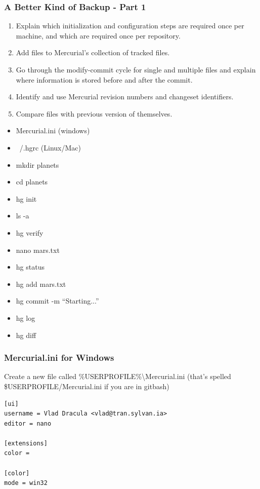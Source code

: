 \documentclass[xcolor=dvipsnames]{beamer}
\begin{document}
\begin{frame}
\frametitle{A Better Kind of Backup - Part 1}
\begin{enumerate}
\item Explain which initialization and configuration steps are required once per machine, and which are required once per repository.
\item Add files to Mercurial's collection of tracked files.
\item Go through the modify-commit cycle for single and multiple files and explain where information is stored before and after the commit.
\item Identify and use Mercurial revision numbers and changeset identifiers.
\item Compare files with previous version of themselves.
\end{enumerate}

\begin{multicols}{2}
\begin{itemize}
\item Mercurial.ini (windows)
\item ~/.hgrc (Linux/Mac)
\item mkdir planets
\item cd planets
\item hg init
\item ls -a
\item hg verify
\item nano mars.txt
\item hg status
\item hg add mars.txt
\item hg commit -m ``Starting...''
\item hg log
\item hg diff
\end{itemize}
\end{multicols}
\end{frame}

\begin{frame}[fragile]
\frametitle{Mercurial.ini for Windows}
Create a new file called \%USERPROFILE\%\textbackslash Mercurial.ini (that's spelled \$USERPROFILE/Mercurial.ini if you are in gitbash)
\begin{verbatim}
[ui]
username = Vlad Dracula <vlad@tran.sylvan.ia>
editor = nano

[extensions]
color =

[color]
mode = win32
\end{verbatim}
\end{frame}
\end{document}
